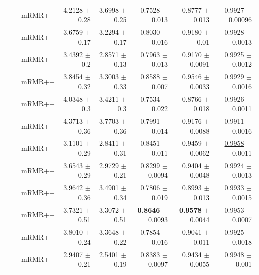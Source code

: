 \begin{longtable}{llp{}rrrrr}
 &  & mRMR++ & 4.2128 {\scriptsize $\pm$ 0.28} & 3.6998 {\scriptsize $\pm$ 0.25} & 0.7528 {\scriptsize $\pm$ 0.013} & 0.8777 {\scriptsize $\pm$ 0.013} & 0.9927 {\scriptsize $\pm$ 0.00096} \\
 &  & mRMR++ & 3.6759 {\scriptsize $\pm$ 0.17} & 3.2294 {\scriptsize $\pm$ 0.17} & 0.8030 {\scriptsize $\pm$ 0.016} & 0.9180 {\scriptsize $\pm$ 0.01} & 0.9928 {\scriptsize $\pm$ 0.0013} \\
 &  & mRMR++ & 3.4392 {\scriptsize $\pm$ 0.2} & 2.8571 {\scriptsize $\pm$ 0.13} & 0.7963 {\scriptsize $\pm$ 0.013} & 0.9170 {\scriptsize $\pm$ 0.0091} & 0.9925 {\scriptsize $\pm$ 0.0012} \\
 &  & mRMR++ & 3.8454 {\scriptsize $\pm$ 0.32} & 3.3003 {\scriptsize $\pm$ 0.33} & \underline{0.8588} {\scriptsize $\pm$ 0.007} & \underline{0.9546} {\scriptsize $\pm$ 0.0033} & 0.9929 {\scriptsize $\pm$ 0.0016} \\
 &  & mRMR++ & 4.0348 {\scriptsize $\pm$ 0.3} & 3.4211 {\scriptsize $\pm$ 0.3} & 0.7534 {\scriptsize $\pm$ 0.022} & 0.8766 {\scriptsize $\pm$ 0.018} & 0.9926 {\scriptsize $\pm$ 0.0011} \\
 &  & mRMR++ & 4.3713 {\scriptsize $\pm$ 0.36} & 3.7703 {\scriptsize $\pm$ 0.36} & 0.7991 {\scriptsize $\pm$ 0.014} & 0.9176 {\scriptsize $\pm$ 0.0088} & 0.9911 {\scriptsize $\pm$ 0.0016} \\
 &  & mRMR++ & 3.1101 {\scriptsize $\pm$ 0.29} & 2.8411 {\scriptsize $\pm$ 0.31} & 0.8451 {\scriptsize $\pm$ 0.011} & 0.9459 {\scriptsize $\pm$ 0.0062} & \underline{0.9958} {\scriptsize $\pm$ 0.0011} \\
 &  & mRMR++ & 3.6543 {\scriptsize $\pm$ 0.29} & 2.9729 {\scriptsize $\pm$ 0.21} & 0.8299 {\scriptsize $\pm$ 0.0094} & 0.9404 {\scriptsize $\pm$ 0.0048} & 0.9924 {\scriptsize $\pm$ 0.0013} \\
 &  & mRMR++ & 3.9642 {\scriptsize $\pm$ 0.36} & 3.4901 {\scriptsize $\pm$ 0.34} & 0.7806 {\scriptsize $\pm$ 0.019} & 0.8993 {\scriptsize $\pm$ 0.013} & 0.9933 {\scriptsize $\pm$ 0.0015} \\
 &  & mRMR++ & 3.7321 {\scriptsize $\pm$ 0.51} & 3.3072 {\scriptsize $\pm$ 0.51} & \textbf{0.8646} {\scriptsize $\pm$ 0.0093} & \textbf{0.9578} {\scriptsize $\pm$ 0.0044} & 0.9953 {\scriptsize $\pm$ 0.0007} \\
 &  & mRMR++ & 3.8010 {\scriptsize $\pm$ 0.24} & 3.3648 {\scriptsize $\pm$ 0.22} & 0.7854 {\scriptsize $\pm$ 0.016} & 0.9041 {\scriptsize $\pm$ 0.011} & 0.9925 {\scriptsize $\pm$ 0.0018} \\
 &  & mRMR++ & 2.9407 {\scriptsize $\pm$ 0.21} & \underline{2.5401} {\scriptsize $\pm$ 0.19} & 0.8383 {\scriptsize $\pm$ 0.0097} & 0.9434 {\scriptsize $\pm$ 0.0055} & 0.9948 {\scriptsize $\pm$ 0.001} \\

\end{longtable}
